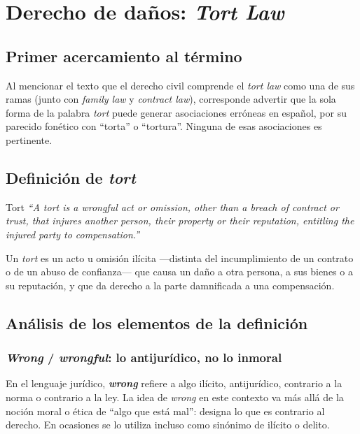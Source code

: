 \documentclass[12pt,oneside]{book}
\begin{document}
\chapter{Derecho de daños: \textit{Tort Law}}

\section{Primer acercamiento al término}

Al mencionar el texto que el derecho civil comprende el \textit{tort law} como una de sus ramas (junto con \textit{family law} y \textit{contract law}), corresponde advertir que la sola forma de la palabra \textit{tort} puede generar asociaciones erróneas en español, por su parecido fonético con ``torta'' o ``tortura''. Ninguna de esas asociaciones es pertinente.

\section{Definición de \textit{tort}}

\begin{definition}{Tort}
\textit{``A tort is a wrongful act or omission, other than a breach of contract or trust, that injures another person, their property or their reputation, entitling the injured party to compensation.''}

\medskip

Un \textit{tort} es un acto u omisión ilícita ---distinta del incumplimiento de un contrato o de un abuso de confianza--- que causa un daño a otra persona, a sus bienes o a su reputación, y que da derecho a la parte damnificada a una compensación.
\end{definition}

\section{Análisis de los elementos de la definición}

\subsection{\textit{Wrong} / \textit{wrongful}: lo antijurídico, no lo inmoral}

En el lenguaje jurídico, \textbf{\textit{wrong}} refiere a algo ilícito, antijurídico, contrario a la norma o contrario a la ley. La idea de \textit{wrong} en este contexto va más allá de la noción moral o ética de ``algo que está mal'': designa lo que es contrario al derecho. En ocasiones se lo utiliza incluso como sinónimo de ilícito o delito.
\end{document}
